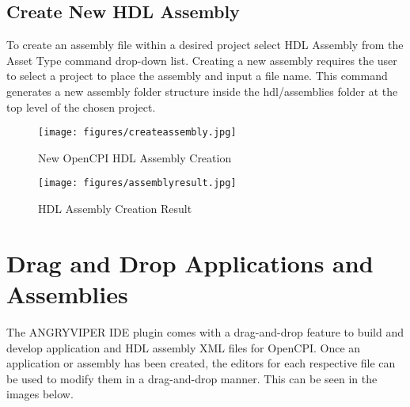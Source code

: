 \newpage

\subsection{Create New HDL Assembly}
\label{sec:create_assembly}
\begin{flushleft}

To create an assembly file within a desired project select HDL Assembly from the Asset Type command drop-down list. Creating a new assembly requires the user to select a project to place the assembly and input a file name. This command generates a new assembly folder structure inside the hdl/assemblies folder at the top level of the chosen project.\newline
\begin{figure}[h!]
  \centering
  \texttt{[image: figures/createassembly.jpg]}
  \caption{New OpenCPI HDL Assembly Creation}
  \label{fig:figure14}
\end{figure}

\begin{figure}[h!]
  \centering
  \texttt{[image: figures/assemblyresult.jpg]}
  \caption{HDL Assembly Creation Result}
  \label{fig:figure15}
\end{figure}

\end{flushleft}

\newpage

\section{Drag and Drop Applications and Assemblies}
\label{sec:drag_and_drop}
\begin{flushleft}

The ANGRYVIPER IDE plugin comes with a drag-and-drop feature to build and develop application and HDL assembly XML files for OpenCPI. Once an application or assembly has been created, the editors for each respective file can be used to modify them in a drag-and-drop manner. This can be seen in the images below.

\end{flushleft}

